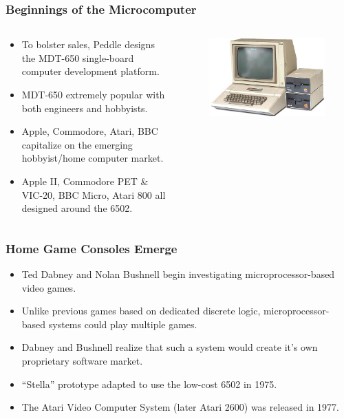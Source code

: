 \documentclass{beamer}
\begin{document}
\begin{frame}
\frametitle{Beginnings of the Microcomputer}
\begin{columns}[T]
\begin{column}[T]{0.6\textwidth}
\begin{itemize}
\item To bolster sales, Peddle designs the MDT-650 single-board computer development platform.
\item MDT-650 extremely popular with both engineers and hobbyists.
\item Apple, Commodore, Atari, BBC capitalize on the emerging hobbyist/home computer market.
\item Apple II, Commodore PET \& VIC-20, BBC Micro, Atari 800 all designed around the 6502.
\end{itemize}
\end{column}
\begin{column}[T]{0.4\textwidth}
\begin{figure}
\centering
\includegraphics[scale=0.225]{images/appleii-system.jpg}
\end{figure}
\end{column}
\end{columns}
\end{frame}

\begin{frame}
\frametitle{Home Game Consoles Emerge}
\begin{itemize}
\item Ted Dabney and Nolan Bushnell begin investigating microprocessor-based video games.
\item Unlike previous games based on dedicated discrete logic, microprocessor-based systems could play multiple games.
\item Dabney and Bushnell realize that such a system would create it's own proprietary software market.
\item ``Stella'' prototype adapted to use the low-cost 6502 in 1975.
\item The Atari Video Computer System (later Atari 2600) was released in 1977.
\end{itemize}
\end{frame}
\end{document}
